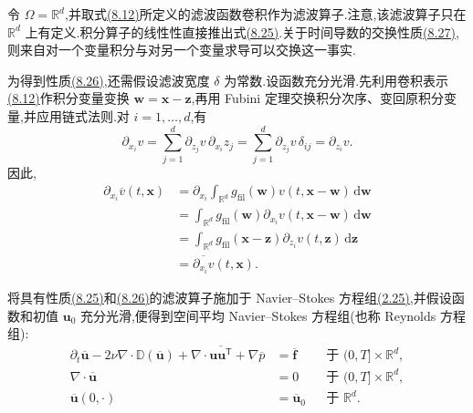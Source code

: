 \begin{note}[全空间情形下的卷积滤波]
\label{note:convolution-filtering-full-space}
令 $\Omega=\mathbb{R}^d$,并取式\hyperref[eq:space-average-convolution]{(8.12)}所定义的滤波函数卷积作为滤波算子.注意,该滤波算子只在 $\mathbb{R}^d$ 上有定义.积分算子的线性性直接推出式\hyperref[eq:filter-linearity]{(8.25)}.关于时间导数的交换性质\hyperref[eq:filter-commutation-time-derivative]{(8.27)},则来自对一个变量积分与对另一个变量求导可以交换这一事实.

为得到性质\hyperref[eq:filter-commutation-space-derivative]{(8.26)},还需假设滤波宽度 $\delta$ 为常数.设函数充分光滑.先利用卷积表示\hyperref[eq:space-average-convolution]{(8.12)}作积分变量变换 $\bm{w}=\bm{x}-\bm{z}$,再用 Fubini 定理交换积分次序、变回原积分变量,并应用链式法则.对 $i=1,\ldots,d$,有
\[
 \partial_{x_i}v
  =\sum_{j=1}^d\partial_{z_j}v\,\partial_{x_i}z_j
  =\sum_{j=1}^d\partial_{z_j}v\,\delta_{ij}
  =\partial_{z_i}v.
\]
因此,
\[
\begin{aligned}
 \partial_{x_i}\overline{v}(t,\bm{x})
  &=\partial_{x_i}
    \int_{\mathbb{R}^d}
     g_{\mathrm{fil}}(\bm{w})
     v(t,\bm{x}-\bm{w})\,\mathrm{d}\bm{w}\\
  &=\int_{\mathbb{R}^d}
     g_{\mathrm{fil}}(\bm{w})
     \partial_{x_i}v(t,\bm{x}-\bm{w})\,\mathrm{d}\bm{w}\\
  &=\int_{\mathbb{R}^d}
     g_{\mathrm{fil}}(\bm{x}-\bm{z})
     \partial_{z_i}v(t,\bm{z})\,\mathrm{d}\bm{z}\\
  &=\overline{\partial_{x_i}v}(t,\bm{x}).
\end{aligned}
\]
\end{note}

\begin{note}
\label{note:space-averaged-ns-full-space}
将具有性质\hyperref[eq:filter-linearity]{(8.25)}和\hyperref[eq:filter-commutation-space-derivative]{(8.26)}的滤波算子施加于 Navier--Stokes 方程组\hyperref[eq:incompressible-navier-stokes]{(2.25)},并假设函数和初值 $\bm{u}_0$ 充分光滑,便得到空间平均 Navier--Stokes 方程组(也称 Reynolds 方程组):
\begin{equation}\label{eq:space-averaged-navier-stokes-full-space}
\begin{aligned}
 \partial_t\overline{\bm{u}}
  -2\nu\nabla\cdot\mathbb{D}(\overline{\bm{u}})
  +\nabla\cdot\overline{\bm{u}\bm{u}^{\mathsf T}}
  +\nabla\overline{p}
   &=\overline{\bm{f}}
      &&\text{于 }(0,T]\times\mathbb{R}^d,\\
 \nabla\cdot\overline{\bm{u}}
   &=0
      &&\text{于 }(0,T]\times\mathbb{R}^d,\\
 \overline{\bm{u}}(0,\cdot)
   &=\overline{\bm{u}}_0
      &&\text{于 }\mathbb{R}^d.
\end{aligned}
\end{equation}
\end{note}

